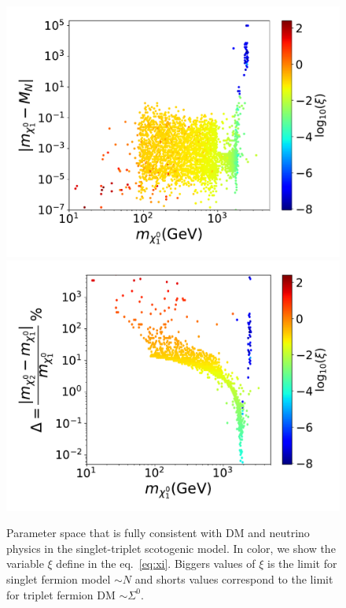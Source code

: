 \documentclass[12pt,letterpaper]{article}
\begin{document}
\begin{figure}
\begin{center}
\includegraphics[scale=0.43]{mxoMN_with_neutrino_physics}
\includegraphics[scale=0.43]{mxoMTF_with_neutrino_physics}
\caption{Parameter space that is fully consistent with DM and neutrino physics in the singlet-triplet scotogenic model. In color, we show the variable $\xi$ define in the eq.~\ref{eq:xi}. Biggers values of $\xi$ is the limit for singlet fermion model $\sim N$ and shorts values correspond to the limit for triplet fermion DM $\sim \Sigma^0$.}
\label{fig:MN-and-MTF}
\end{center}
\end{figure}
%
\end{document}
